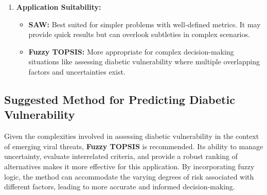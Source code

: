 \documentclass[12pt,a4paper]{article}
\begin{document}
\begin{enumerate}
     \item \textbf{Application Suitability:}
    \begin{itemize}
        \item \textbf{SAW: } Best suited for simpler problems with well-defined metrics. It may provide quick results but can overlook subtleties in complex scenarios.

        \item \textbf{Fuzzy TOPSIS: } More appropriate for complex decision-making situations like assessing diabetic vulnerability where multiple overlapping factors and uncertainties exist.
 
    \end{itemize}
  
\end{enumerate}

\subsection*{Suggested Method for Predicting Diabetic Vulnerability}

\hspace{1em}Given the complexities involved in assessing diabetic vulnerability in the context of emerging viral threats, \textbf{Fuzzy TOPSIS} is recommended. Its ability to manage uncertainty, evaluate interrelated criteria, and provide a robust ranking of alternatives makes it more effective for this application. By incorporating fuzzy logic, the method can accommodate the varying degrees of risk associated with different factors, leading to more accurate and informed decision-making.
\end{document}
